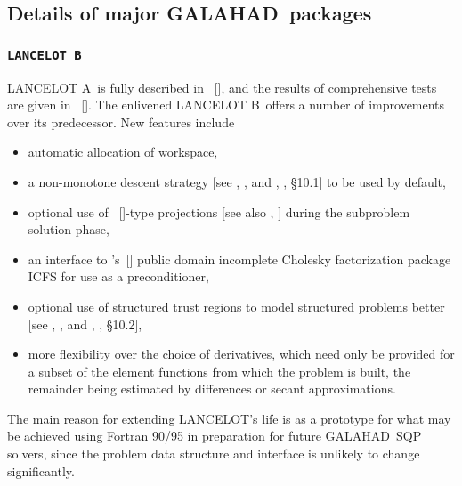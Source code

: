 \documentclass[acmtocl,acmnow]{acmtrans2m}
\newcommand{\gal}{{\sf GALAHAD}}
\newcommand{\lan}{{\sf LANCELOT}}
\newcommand{\lana}{{\sf LANCELOT A}}
\newcommand{\lanb}{{\sf LANCELOT B}}
\newcommand{\citebb}[1]{\citeauthor{#1}\ [\citeyear{#1}]}
\newcommand{\citebbs}[1]{\citeauthor{#1}'s\ [\citeyear{#1}]}
\newcommand{\bciteb}[1]{\citeauthor{#1}, \citeyear{#1}}
\begin{document}
\subsection{Details of major \gal\ packages\label{major}}

\subsubsection{{\tt LANCELOT B}\label{lanb}}

\lana\ is fully described in \citebb{ConnGoulToin92}, and the results
of comprehensive tests are given in \citebb{ConnGoulToin96a}.
The enlivened \lanb\ offers a number of improvements over its predecessor.
New features include
\begin{itemize}
\item automatic allocation of workspace,
\item a non-monotone descent strategy [see \bciteb{Toin96b}, and
\bciteb{ConnGoulToin00}, \S10.1] to be used by default,
\item optional use of \citebb{MoreTora91}-type projections
   [see also \bciteb{LinMore99b}]
   during the subproblem solution phase,
\item an interface to \citebbs{LinMore99} public domain incomplete Cholesky
   factorization package ICFS for use as a preconditioner,
\item optional use of structured trust regions to model
   structured problems better [see \bciteb{ConnGoulSartToin96a}, and
   \bciteb{ConnGoulToin00}, \S10.2],
\item more flexibility over the choice of derivatives, which need
   only be provided for a subset of the element functions from which the
   problem is built, the remainder being estimated by differences or secant
   approximations.
\end{itemize}
The main reason for extending \lan's life is as a prototype
for what may be achieved using Fortran 90/95 in preparation for
future \gal\ SQP solvers, since the problem data structure and
interface is unlikely to change significantly.
\end{document}
